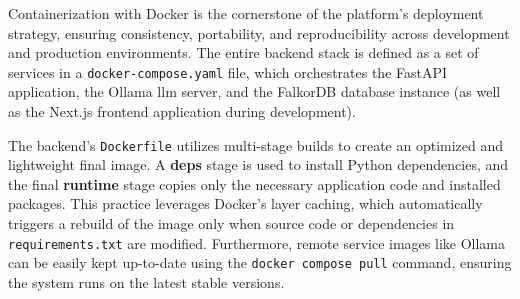 Containerization with Docker \cite{DOCKER} is the cornerstone of the platform's deployment strategy, ensuring consistency, portability, and reproducibility across development and production environments. The entire backend stack is defined as a set of services in a \texttt{docker-compose.yaml} file, which orchestrates the FastAPI application, the Ollama \ac{llm} server, and the FalkorDB database instance (as well as the Next.js frontend application during development).

The backend's \texttt{Dockerfile} utilizes multi-stage builds to create an optimized and lightweight final image. A \textbf{deps} stage is used to install Python dependencies, and the final \textbf{runtime} stage copies only the necessary application code and installed packages. This practice leverages Docker's layer caching, which automatically triggers a rebuild of the image only when source code or dependencies in \texttt{requirements.txt} are modified. Furthermore, remote service images like Ollama can be easily kept up-to-date using the \texttt{docker compose pull} command, ensuring the system runs on the latest stable versions.